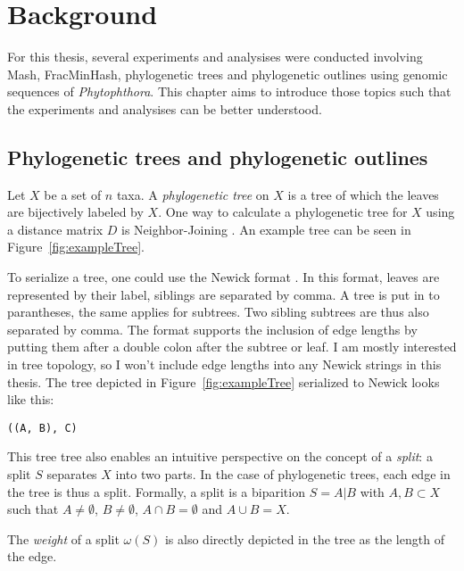 
\chapter{Background}
  \label{sec:background}

For this thesis, several experiments and analysises were conducted involving
Mash, FracMinHash, phylogenetic trees and phylogenetic outlines using genomic
sequences of \textit{Phytophthora}. This chapter aims to introduce those topics
such that the experiments and analysises can be better understood.

\section{Phylogenetic trees and phylogenetic outlines}
Let $X$ be a set of $n$ taxa. A \textit{phylogenetic tree} on $X$ is a tree of
which the leaves are bijectively labeled by $X$. One way to calculate a
phylogenetic tree for $X$ using a distance matrix $D$ is Neighbor-Joining
\cite{saitouNeighborjoiningMethodNew1987}. An example tree can be seen in
Figure~\ref{fig:exampleTree}. 

To serialize a tree, one could use the Newick format
\cite{pavlopoulosReferenceGuideTree2010}. In this format, leaves are represented
by their label, siblings are separated by comma. A tree is put in to
parantheses, the same applies for subtrees. Two sibling subtrees are thus also
separated by comma. The format supports the inclusion of edge lengths by putting
them after a double colon after the subtree or leaf. I am mostly interested in
tree topology, so I won't include edge lengths into any Newick strings in this
thesis. The tree depicted in Figure~\ref{fig:exampleTree} serialized to Newick
looks like this:

\texttt{((A, B), C)}

This tree tree also enables an intuitive perspective on the concept of a
\textit{split}: a split $S$ separates $X$ into two parts. In the case of
phylogenetic trees, each edge in the tree is thus a split. Formally, a
split is a biparition $S=A|B$ with $A, B \subset X$ such that $A \neq
\emptyset$, $B \neq \emptyset$, $A \cap B = \emptyset$ and $A \cup B = X$.

The \textit{weight} of a split $\omega(S)$ is also directly depicted in the tree
as the length of the edge. 

